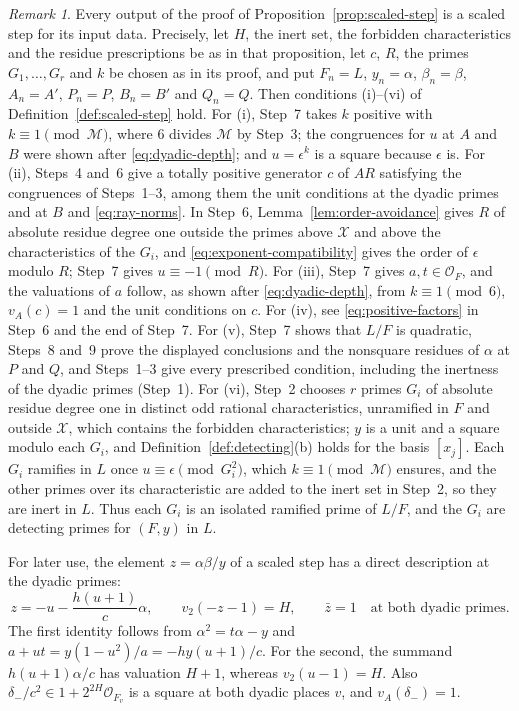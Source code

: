 \documentclass[11pt]{article}
\theoremstyle{plain}
\theoremstyle{definition}
\theoremstyle{remark}
\newtheorem{remark}[theorem]{Remark}
\newcommand{\OO}{\mathcal O}
\begin{document}
\begin{remark}\label{rem:scaled-step-outputs}
Every output of the proof of Proposition~\ref{prop:scaled-step} is a
scaled step for its input data.  Precisely, let $H$, the inert set, the
forbidden characteristics and the residue prescriptions be as in that
proposition, let $c$, $R$, the primes $G_1,\dots,G_r$ and $k$ be chosen
as in its proof, and put $F_n=L$, $y_n=\alpha$, $\beta_n=\beta$,
$A_n=A'$, $P_n=P$, $B_n=B'$ and $Q_n=Q$.  Then conditions (i)--(vi) of
Definition~\ref{def:scaled-step} hold.  For (i), Step~7 takes $k$
positive with $k\equiv1\pmod{\mathcal M}$, where $6$ divides $\mathcal
M$ by Step~3; the congruences for $u$ at $A$ and $B$ were shown after
\eqref{eq:dyadic-depth}; and $u=\epsilon^k$ is a square because
$\epsilon$ is.  For (ii), Steps~4 and~6 give a totally positive
generator $c$ of $AR$ satisfying the congruences of Steps~1--3, among
them the unit conditions at the dyadic primes and at $B$ and
\eqref{eq:ray-norms}.  In Step~6, Lemma~\ref{lem:order-avoidance} gives
$R$ of absolute residue degree one outside the primes above $\mathcal X$
and above the characteristics of the $G_i$, and
\eqref{eq:exponent-compatibility} gives the order of $\epsilon$ modulo
$R$; Step~7 gives $u\equiv-1\pmod R$.  For (iii), Step~7 gives
$a,t\in\OO_F$, and the valuations of $a$ follow, as shown after
\eqref{eq:dyadic-depth}, from $k\equiv1\pmod6$, $v_A(c)=1$ and the
unit conditions on $c$.  For (iv), see \eqref{eq:positive-factors} in
Step~6 and the end of Step~7.  For (v), Step~7 shows that $L/F$ is
quadratic, Steps~8 and~9 prove the displayed conclusions and the
nonsquare residues of $\alpha$ at $P$ and $Q$, and Steps~1--3 give
every prescribed condition, including the inertness of the dyadic primes
(Step~1).  For (vi), Step~2 chooses $r$ primes $G_i$ of absolute residue
degree one in distinct odd rational characteristics, unramified in $F$
and outside $\mathcal X$, which contains the forbidden characteristics;
$y$ is a unit and a square modulo each $G_i$, and
Definition~\ref{def:detecting}(b) holds for the basis $[x_j]$.  Each
$G_i$ ramifies in $L$ once $u\equiv\epsilon\pmod{G_i^2}$, which
$k\equiv1\pmod{\mathcal M}$ ensures, and the other primes over its
characteristic are added to the inert set in Step~2, so they are inert
in $L$.  Thus each $G_i$ is an isolated ramified prime of $L/F$, and the
$G_i$ are detecting primes for $(F,y)$ in $L$.
\end{remark}

For later use, the element $z=\alpha\beta/y$ of a scaled step has a
direct description at the dyadic primes:
\begin{equation}\label{eq:scaled-target}
 z=-u-\frac{h(u+1)}c\alpha,\qquad
 v_2(-z-1)=H,\qquad \bar z=1
 \quad\text{at both dyadic primes}.
\end{equation}
The first identity follows from $\alpha^2=t\alpha-y$ and
$a+ut=y(1-u^2)/a=-hy(u+1)/c$.  For the second, the summand
$h(u+1)\alpha/c$ has valuation $H+1$, whereas $v_2(u-1)=H$.  Also
$\delta_-/c^2\in1+2^{2H}\OO_{F_v}$ is a square at both dyadic places $v$,
and $v_A(\delta_-)=1$.
\end{document}
